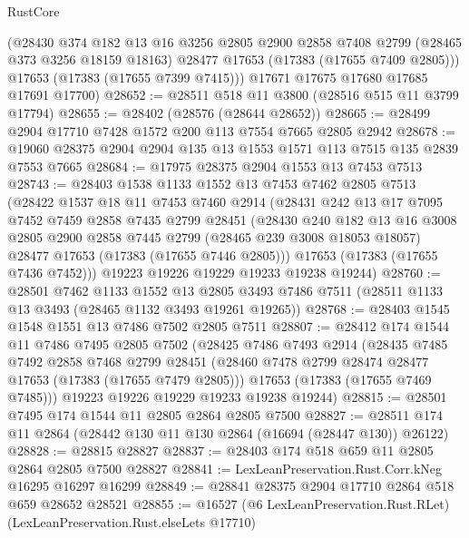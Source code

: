 \begin{lexlean}{RustCore}
\begin{coremodule}
        (@28430
          @374
          @182
          @13
          @16
          @3256
          @2805
          @2900
          @2858
          @7408
          @2799
          (@28465 @373 @3256 @18159 @18163)
          @28477
          @17653
          (@17383 (@17655 @7409 @2805)))
        @17653
        (@17383 (@17655 @7399 @7415)))
      @17671
      @17675
      @17680
      @17685
      @17691
      @17700)
@28652 := @28511 @518 @11 @3800 (@28516 @515 @11 @3799 @17794)
@28655 := @28402 (@28576 (@28644 @28652))
@28665 := @28499 @2904 @17710 @7428 @1572 @200 @113 @7554 @7665 @2805 @2942
@28678 := @19060 @28375 @2904 @2904 @135 @13 @1553 @1571 @113 @7515 @135 @2839 @7553 @7665
@28684 := @17975 @28375 @2904 @1553 @13 @7453 @7513
@28743 := @28403
    @1538
    @1133
    @1552
    @13
    @7453
    @7462
    @2805
    @7513
    (@28422
      @1537
      @18
      @11
      @7453
      @7460
      @2914
      (@28431
        @242
        @13
        @17
        @7095
        @7452
        @7459
        @2858
        @7435
        @2799
        @28451
        (@28430
          @240
          @182
          @13
          @16
          @3008
          @2805
          @2900
          @2858
          @7445
          @2799
          (@28465 @239 @3008 @18053 @18057)
          @28477
          @17653
          (@17383 (@17655 @7446 @2805)))
        @17653
        (@17383 (@17655 @7436 @7452)))
      @19223
      @19226
      @19229
      @19233
      @19238
      @19244)
@28760 := @28501
    @7462
    @1133
    @1552
    @13
    @2805
    @3493
    @7486
    @7511
    (@28511 @1133 @13 @3493 (@28465 @1132 @3493 @19261 @19265))
@28768 := @28403 @1545 @1548 @1551 @13 @7486 @7502 @2805 @7511
@28807 := @28412
    @174
    @1544
    @11
    @7486
    @7495
    @2805
    @7502
    (@28425
      @7486
      @7493
      @2914
      (@28435
        @7485
        @7492
        @2858
        @7468
        @2799
        @28451
        (@28460 @7478 @2799 @28474 @28477 @17653 (@17383 (@17655 @7479 @2805)))
        @17653
        (@17383 (@17655 @7469 @7485)))
      @19223
      @19226
      @19229
      @19233
      @19238
      @19244)
@28815 := @28501 @7495 @174 @1544 @11 @2805 @2864 @2805 @7500
@28827 := @28511 @174 @11 @2864 (@28442 @130 @11 @130 @2864 (@16694 (@28447 @130)) @26122)
@28828 := @28815 @28827
@28837 := @28403 @174 @518 @659 @11 @2805 @2864 @2805 @7500 @28827
@28841 := LexLeanPreservation.Rust.Corr.kNeg @16295 @16297 @16299
@28849 := @28841 @28375 @2904 @17710 @2864 @518 @659 @28652 @28521
@28855 := @16527 (@6 LexLeanPreservation.Rust.RLet) (LexLeanPreservation.Rust.elseLets @17710)

\end{coremodule}
\end{lexlean}
